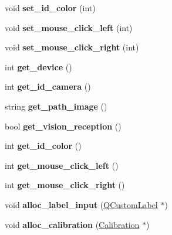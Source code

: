 \begin{DoxyCompactItemize}
\item 
\hypertarget{classcalibration_a6e2c50598a4f5d49c6d7bda23b69ddf3}{void {\bfseries set\-\_\-id\-\_\-color} (int)}\label{classcalibration_a6e2c50598a4f5d49c6d7bda23b69ddf3}

\item 
\hypertarget{classcalibration_aaaf40baef708cb370c468ea0799ffaf6}{void {\bfseries set\-\_\-mouse\-\_\-click\-\_\-left} (int)}\label{classcalibration_aaaf40baef708cb370c468ea0799ffaf6}

\item 
\hypertarget{classcalibration_a788f9207f8641b1c3d3a74760e636bb3}{void {\bfseries set\-\_\-mouse\-\_\-click\-\_\-right} (int)}\label{classcalibration_a788f9207f8641b1c3d3a74760e636bb3}

\item 
\hypertarget{classcalibration_a4c62df2cfea03276dde05134fd234b2c}{int {\bfseries get\-\_\-device} ()}\label{classcalibration_a4c62df2cfea03276dde05134fd234b2c}

\item 
\hypertarget{classcalibration_a94b344ed8858fcb8509ba313d101d9c2}{int {\bfseries get\-\_\-id\-\_\-camera} ()}\label{classcalibration_a94b344ed8858fcb8509ba313d101d9c2}

\item 
\hypertarget{classcalibration_aa607fee8c37d34cf3d812063ca7fb626}{string {\bfseries get\-\_\-path\-\_\-image} ()}\label{classcalibration_aa607fee8c37d34cf3d812063ca7fb626}

\item 
\hypertarget{classcalibration_a567ceb5a68243624b3240955fdbfc50e}{bool {\bfseries get\-\_\-vision\-\_\-reception} ()}\label{classcalibration_a567ceb5a68243624b3240955fdbfc50e}

\item 
\hypertarget{classcalibration_a284e8a7b65d67601bd8d7bef949524df}{int {\bfseries get\-\_\-id\-\_\-color} ()}\label{classcalibration_a284e8a7b65d67601bd8d7bef949524df}

\item 
\hypertarget{classcalibration_a45d0e76b3f360c7b198166cf7ccc638d}{int {\bfseries get\-\_\-mouse\-\_\-click\-\_\-left} ()}\label{classcalibration_a45d0e76b3f360c7b198166cf7ccc638d}

\item 
\hypertarget{classcalibration_a8053c43e483faf127e20e16ff4ee6d8a}{int {\bfseries get\-\_\-mouse\-\_\-click\-\_\-right} ()}\label{classcalibration_a8053c43e483faf127e20e16ff4ee6d8a}

\item 
\hypertarget{classcalibration_ab0b5f5514c665852aa63830121622518}{void {\bfseries alloc\-\_\-label\-\_\-input} (\hyperlink{classQCustomLabel}{Q\-Custom\-Label} $\ast$)}\label{classcalibration_ab0b5f5514c665852aa63830121622518}

\item 
\hypertarget{classcalibration_ac5e4cd1cead7176b0f34586112aaa918}{void {\bfseries alloc\-\_\-calibration} (\hyperlink{structcommon_1_1Calibration}{Calibration} $\ast$)}\label{classcalibration_ac5e4cd1cead7176b0f34586112aaa918}

\end{DoxyCompactItemize}
